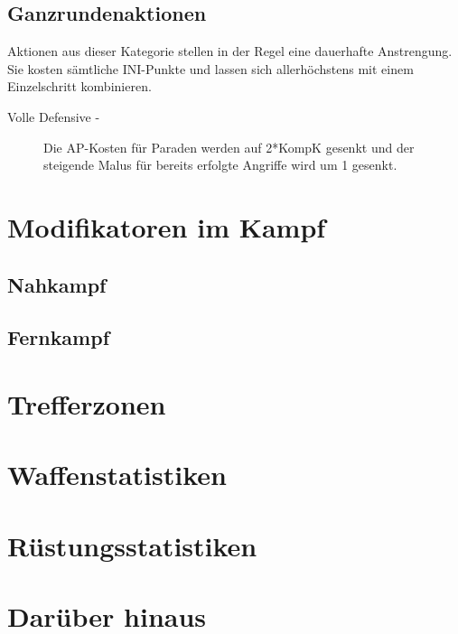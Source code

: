 \documentclass[a4paper,12pt,oneside]{book}
\begin{document}
\section{Ganzrundenaktionen}
Aktionen aus dieser Kategorie stellen in der Regel eine dauerhafte Anstrengung. Sie kosten sämtliche INI-Punkte und lassen sich allerhöchstens mit einem Einzelschritt kombinieren.
\begin{description}
\item[Volle Defensive -] Die AP-Kosten für Paraden werden auf 2*KompK gesenkt und der steigende Malus für bereits erfolgte Angriffe wird um 1 gesenkt.
\end{description}


\chapter{Modifikatoren im Kampf}

\section{Nahkampf}

\section{Fernkampf}

\chapter{Trefferzonen}

\chapter{Waffenstatistiken}

\chapter{Rüstungsstatistiken}

\chapter{Darüber hinaus}
\end{document}
